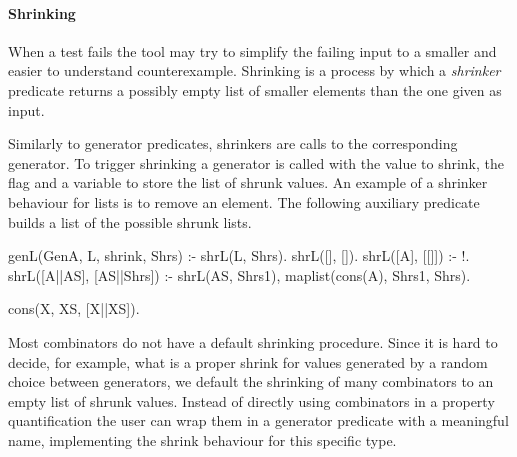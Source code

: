 \paragraph{\bf Shrinking}

When a test fails the tool may try to simplify the failing input to a
smaller and easier to understand counterexample.
%
Shrinking is a process by which a \emph{shrinker} predicate returns a
possibly empty list of smaller elements than the one given as input.


Similarly to generator predicates, shrinkers are calls to the
corresponding generator.
%
To trigger shrinking a generator is called with the value to shrink, the
flag  and a variable to store the list of shrunk values.
%
An example of a shrinker behaviour for lists is to remove an
element.
%
The following auxiliary predicate builds a list of the possible shrunk
lists.
%
\begin{yapcode}
 genL(GenA, L, shrink, Shrs) :-  shrL(L, Shrs).
 shrL([], []).
 shrL([A], [[]]) :- !.
 shrL([A||AS], [AS||Shrs]) :-
   shrL(AS, Shrs1), maplist(cons(A), Shrs1, Shrs).

 cons(X, XS, [X||XS]).
\end{yapcode}


Most combinators do not have a default shrinking procedure.
%
Since it is hard to decide, for example, what is a proper shrink for
values generated by a random choice between generators, we default
the shrinking of many combinators to an empty list of shrunk values.
%
Instead of directly using combinators in a property quantification
the user can wrap them in a generator predicate with a meaningful name,
implementing the shrink behaviour for this specific type.
